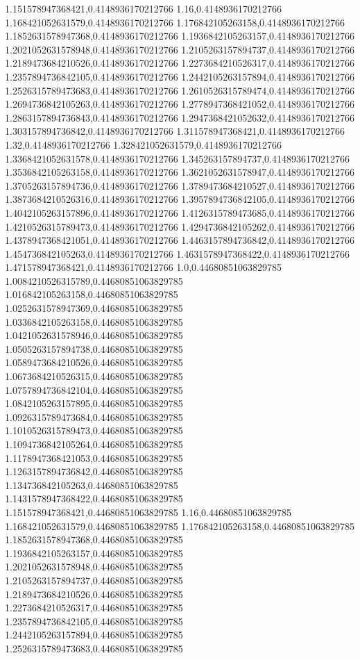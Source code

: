 1.151578947368421,0.4148936170212766
1.16,0.4148936170212766
1.168421052631579,0.4148936170212766
1.176842105263158,0.4148936170212766
1.1852631578947368,0.4148936170212766
1.1936842105263157,0.4148936170212766
1.2021052631578948,0.4148936170212766
1.2105263157894737,0.4148936170212766
1.2189473684210526,0.4148936170212766
1.2273684210526317,0.4148936170212766
1.2357894736842105,0.4148936170212766
1.2442105263157894,0.4148936170212766
1.2526315789473683,0.4148936170212766
1.2610526315789474,0.4148936170212766
1.2694736842105263,0.4148936170212766
1.2778947368421052,0.4148936170212766
1.2863157894736843,0.4148936170212766
1.2947368421052632,0.4148936170212766
1.303157894736842,0.4148936170212766
1.311578947368421,0.4148936170212766
1.32,0.4148936170212766
1.328421052631579,0.4148936170212766
1.3368421052631578,0.4148936170212766
1.345263157894737,0.4148936170212766
1.3536842105263158,0.4148936170212766
1.3621052631578947,0.4148936170212766
1.3705263157894736,0.4148936170212766
1.3789473684210527,0.4148936170212766
1.3873684210526316,0.4148936170212766
1.3957894736842105,0.4148936170212766
1.4042105263157896,0.4148936170212766
1.4126315789473685,0.4148936170212766
1.4210526315789473,0.4148936170212766
1.4294736842105262,0.4148936170212766
1.4378947368421051,0.4148936170212766
1.4463157894736842,0.4148936170212766
1.454736842105263,0.4148936170212766
1.4631578947368422,0.4148936170212766
1.471578947368421,0.4148936170212766
1.0,0.44680851063829785
1.0084210526315789,0.44680851063829785
1.016842105263158,0.44680851063829785
1.0252631578947369,0.44680851063829785
1.0336842105263158,0.44680851063829785
1.0421052631578946,0.44680851063829785
1.0505263157894738,0.44680851063829785
1.0589473684210526,0.44680851063829785
1.0673684210526315,0.44680851063829785
1.0757894736842104,0.44680851063829785
1.0842105263157895,0.44680851063829785
1.0926315789473684,0.44680851063829785
1.1010526315789473,0.44680851063829785
1.1094736842105264,0.44680851063829785
1.1178947368421053,0.44680851063829785
1.1263157894736842,0.44680851063829785
1.134736842105263,0.44680851063829785
1.1431578947368422,0.44680851063829785
1.151578947368421,0.44680851063829785
1.16,0.44680851063829785
1.168421052631579,0.44680851063829785
1.176842105263158,0.44680851063829785
1.1852631578947368,0.44680851063829785
1.1936842105263157,0.44680851063829785
1.2021052631578948,0.44680851063829785
1.2105263157894737,0.44680851063829785
1.2189473684210526,0.44680851063829785
1.2273684210526317,0.44680851063829785
1.2357894736842105,0.44680851063829785
1.2442105263157894,0.44680851063829785
1.2526315789473683,0.44680851063829785
